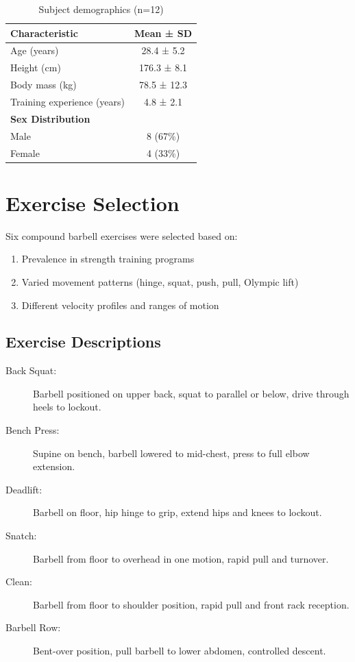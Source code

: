 \begin{table}[h]
    \centering
    \caption{Subject demographics (n=12)}
    \label{tab:demographics}
    \begin{tabular}{lc}
        \toprule
        \textbf{Characteristic} & \textbf{Mean ± SD} \\
        \midrule
        Age (years) & 28.4 ± 5.2 \\
        Height (cm) & 176.3 ± 8.1 \\
        Body mass (kg) & 78.5 ± 12.3 \\
        Training experience (years) & 4.8 ± 2.1 \\
        \midrule
        \textbf{Sex Distribution} & \\
        Male & 8 (67\%) \\
        Female & 4 (33\%) \\
        \bottomrule
    \end{tabular}
\end{table}

\section{Exercise Selection}

Six compound barbell exercises were selected based on:
\begin{enumerate}
    \item Prevalence in strength training programs
    \item Varied movement patterns (hinge, squat, push, pull, Olympic lift)
    \item Different velocity profiles and ranges of motion
\end{enumerate}

\subsection{Exercise Descriptions}

\begin{description}
    \item[Back Squat:] Barbell positioned on upper back, squat to parallel or below, drive through heels to lockout.
    \item[Bench Press:] Supine on bench, barbell lowered to mid-chest, press to full elbow extension.
    \item[Deadlift:] Barbell on floor, hip hinge to grip, extend hips and knees to lockout.
    \item[Snatch:] Barbell from floor to overhead in one motion, rapid pull and turnover.
    \item[Clean:] Barbell from floor to shoulder position, rapid pull and front rack reception.
    \item[Barbell Row:] Bent-over position, pull barbell to lower abdomen, controlled descent.
\end{description}

